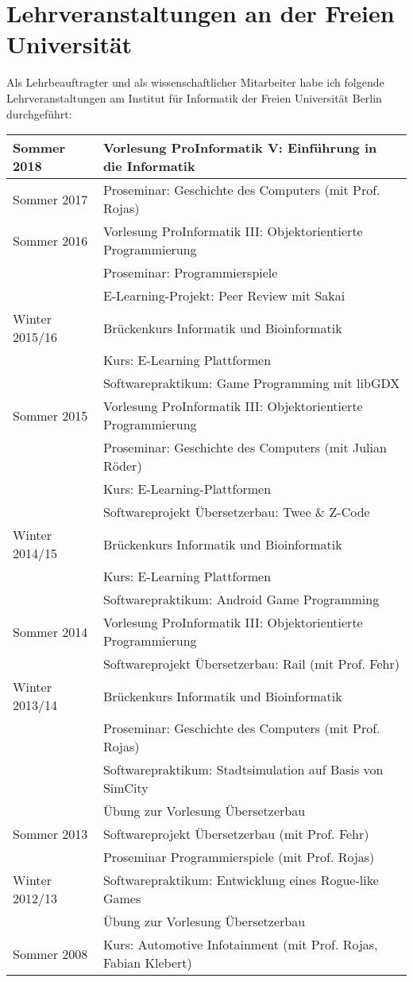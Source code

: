 \documentclass[11pt,ngerman]{article}
\begin{document}
\pagebreak

\section{Lehrveranstaltungen an der Freien Universität}

Als Lehrbeauftragter und als wissenschaftlicher Mitarbeiter habe ich folgende Lehrveranstaltungen am Institut für Informatik der Freien Universität Berlin durchgeführt:\\

\begin{tabular}{ l | l }
  Sommer 2018 & Vorlesung ProInformatik V: Einführung in die Informatik\\
  \hline
  Sommer 2017 & Proseminar: Geschichte des Computers (mit Prof. Rojas)\\
  \hline
  Sommer 2016 & Vorlesung ProInformatik III: Objektorientierte Programmierung\\[-2mm]
  & Proseminar: Programmierspiele\\[-2mm]
  & E-Learning-Projekt: Peer Review mit Sakai\\
  \hline  
Winter 2015/16 & Brückenkurs Informatik und Bioinformatik\\[-2mm]
& Kurs: E-Learning Plattformen\\[-2mm]
& Softwarepraktikum: Game Programming mit libGDX\\
 \hline			
Sommer 2015 & Vorlesung ProInformatik III: Objektorientierte Programmierung\\[-2mm]
& Proseminar: Geschichte des Computers (mit Julian Röder)\\[-2mm]
& Kurs: E-Learning-Plattformen\\[-2mm]
& Softwareprojekt Übersetzerbau: Twee \& Z-Code\\
  \hline
Winter 2014/15 & Brückenkurs Informatik und Bioinformatik\\[-2mm]
& Kurs: E-Learning Plattformen\\[-2mm]
& Softwarepraktikum: Android Game Programming\\
  \hline
Sommer 2014 & Vorlesung ProInformatik III: Objektorientierte Programmierung\\[-2mm]
& Softwareprojekt Übersetzerbau: Rail (mit Prof. Fehr)\\
  \hline
Winter 2013/14 & Brückenkurs Informatik und Bioinformatik\\[-2mm]
& Proseminar: Geschichte des Computers (mit Prof. Rojas)\\[-2mm]
& Softwarepraktikum: Stadtsimulation auf Basis von SimCity\\[-2mm]
& Übung zur Vorlesung Übersetzerbau\\
  \hline
Sommer 2013 & Softwareprojekt Übersetzerbau (mit Prof. Fehr)\\[-2mm]
& Proseminar Programmierspiele (mit Prof. Rojas)\\
  \hline
Winter 2012/13 & Softwarepraktikum: Entwicklung eines Rogue-like Games\\[-2mm]
& Übung zur Vorlesung Übersetzerbau\\
  \hline
Sommer 2008 & Kurs: Automotive Infotainment (mit Prof. Rojas, Fabian Klebert)\\
\end{tabular}
\end{document}
